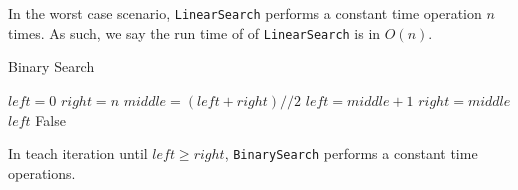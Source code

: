 In the worst case scenario, \texttt{LinearSearch} performs a constant time operation $n$ times. As such, we say the run time of of \texttt{LinearSearch} is in $O(n)$.

\begin{algorithm}[H]
    \caption{Binary Search}
    \label{alg:binary-search}
    \begin{algorithmic}[1]
            \State $left = 0$
            \State $right = n$
            \State $middle = (left + right) // 2$ 
             
            \State $left = middle + 1$ 
            \Else 
            \State $right = middle$ 
            \EndIf
            \EndWhile
             
            \State \Return $left$ 
            \Else 
            \State \Return False 
            \EndIf
        \EndProcedure
    \end{algorithmic}
\end{algorithm}

In teach iteration until $left \geq right$, \texttt{BinarySearch} performs a constant time operations. 